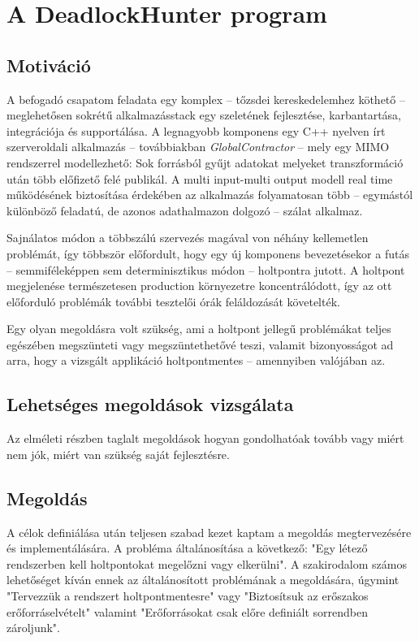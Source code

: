 \chapter{A DeadlockHunter program}

    \section{Motiváció}
    A befogadó csapatom feladata egy komplex -- tőzsdei kereskedelemhez köthető -- meglehetősen sokrétű alkalmazásstack egy szeletének fejlesztése, karbantartása, integrációja és supportálása. A legnagyobb komponens egy C++ nyelven írt szerveroldali alkalmazás -- továbbiakban \emph{GlobalContractor} -- mely egy MIMO rendszerrel modellezhető: Sok forrásból gyűjt adatokat melyeket transzformáció után több előfizető felé publikál. A multi input-multi output modell real time működésének biztosítása érdekében az alkalmazás folyamatosan több -- egymástól különböző feladatú, de azonos adathalmazon dolgozó -- szálat alkalmaz.
    
    Sajnálatos módon a többszálú szervezés magával von néhány kellemetlen problémát, így többször előfordult, hogy egy új komponens bevezetésekor a futás -- semmiféleképpen sem determinisztikus módon -- holtpontra jutott. A holtpont megjelenése természetesen production környezetre koncentrálódott, így az ott előforduló problémák további tesztelői órák feláldozását követelték.
    
    Egy olyan megoldásra volt szükség, ami a holtpont jellegű problémákat teljes egészében megszünteti vagy megszüntethetővé teszi, valamit bizonyosságot ad arra, hogy a vizsgált applikáció holtpontmentes -- amennyiben valójában az.
    
    \section{Lehetséges megoldások vizsgálata} Az elméleti részben taglalt megoldások hogyan gondolhatóak tovább vagy miért nem jók, miért van szükség saját fejlesztésre.%
    
    \section{Megoldás}
    A célok definiálása után teljesen szabad kezet kaptam a megoldás megtervezésére és implementálására. A probléma általánosítása a következő: "Egy létező rendszerben kell holtpontokat megelőzni vagy elkerülni". A szakirodalom számos lehetőséget kíván ennek az általánosított problémának a megoldására, úgymint "Tervezzük a rendszert holtpontmentesre" vagy "Biztosítsuk az erőszakos erőforráselvételt" valamint "Erőforrásokat csak előre definiált sorrendben zároljunk".
    
